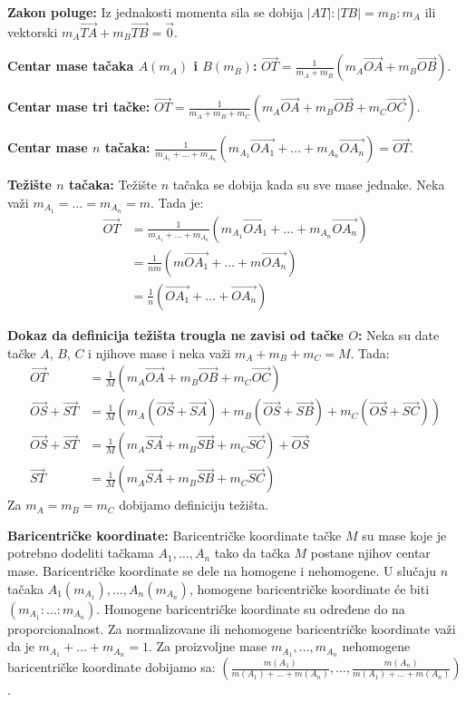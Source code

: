 \documentclass[12pt]{article}
\newcommand{\vek}[1]{\overrightarrow{#1}}
\begin{document}
\textbf{Zakon poluge:} Iz jednakosti momenta sila se dobija
$|AT|:|TB|=m_B:m_A$ ili vektorski $m_A\vek{TA}+m_B\vek{TB}=\vek{0}$.
\par

\textbf{Centar mase tačaka $A(m_A)$ i $B(m_B)$:}
$\vek{OT}=\frac{1}{m_A+m_B}(m_A\vek{OA}+m_B\vek{OB})$.
\par

\textbf{Centar mase tri tačke:} $\vek{OT}=\frac{1}{m_A+m_B+m_C}
    (m_A\vek{OA}+m_B\vek{OB}+m_C\vek{OC})$.
\par

\textbf{Centar mase $n$ tačaka:} $\frac{1}{m_{A_1}+\dotsc+m_{A_n}}
    (m_{A_1}\vek{OA_1}+\dotsc+m_{A_n}\vek{OA_n})=\vek{OT}$.
\par

\textbf{Težište $n$ tačaka:} Težište $n$ tačaka se dobija kada su sve mase
jednake. Neka važi $m_{A_1}=\dotsc=m_{A_n}=m$. Tada je:
\begin{align*}
    \vek{OT} & =\frac{1}{m_{A_1}+\dotsc+m_{A_n}}(m_{A_1}\vek{OA_1}+
    \dotsc+m_{A_n}\vek{OA_n})                                       \\
             & =\frac{1}{nm}(m\vek{OA_1}+\dotsc+m\vek{OA_n})        \\
             & =\frac{1}{n}(\vek{OA_1}+\dotsc+\vek{OA_n})
\end{align*}
\par

\textbf{Dokaz da definicija težišta trougla ne zavisi od tačke $O$:} Neka su
date tačke $A$, $B$, $C$ i njihove mase i neka važi $m_{A}+m_{B}+m_{C}=M$.
Tada:
\begin{align*}
    \vek{OT}          & =\frac{1}{M}(m_{A}\vek{OA}+m_{B}\vek{OB}
    +m_{C}\vek{OC})                                              \\
    \vek{OS}+\vek{ST} & =\frac{1}{M}(m_{A}(\vek{OS}+\vek{SA})
    +m_{B}(\vek{OS}+\vek{SB})+m_{C}(\vek{OS}+\vek{SC}))          \\
    \vek{OS}+\vek{ST} & =\frac{1}{M}(m_{A}\vek{SA}+m_{B}\vek{SB}
    +m_{C}\vek{SC})+\vek{OS}                                     \\
    \vek{ST}          & =\frac{1}{M}(m_{A}\vek{SA}+m_{B}\vek{SB}
    +m_{C}\vek{SC})
\end{align*}
Za $m_{A}=m_{B}=m_{C}$ dobijamo definiciju težišta.
\par

\textbf{Baricentričke koordinate:} Baricentričke koordinate tačke $M$ su mase
koje je potrebno dodeliti tačkama $A_1,\dotsc,A_n$ tako da tačka $M$ postane
njihov centar mase. Baricentričke koordinate se dele na homogene i nehomogene.
U slučaju $n$ tačaka $A_1(m_{A_1}),\dotsc,A_n(m_{A_n})$, homogene
baricentričke koordinate će biti $(m_{A_1}:\dotsc:m_{A_n})$. Homogene
baricentričke koordinate su određene do na proporcionalnost. Za normalizovane
ili nehomogene baricentričke koordinate važi da je $m_{A_1}+\dotsc+m_{A_n}=1$.
Za proizvoljne mase $m_{A_1},\dotsc,m_{A_n}$ nehomogene baricentričke
koordinate dobijamo sa: $(\frac{m(A_1)}{m(A_1)+\dotsc+m(A_n)},\dotsc,
    \frac{m(A_n)}{m(A_1)+\dotsc+m(A_n)})$.
\end{document}
